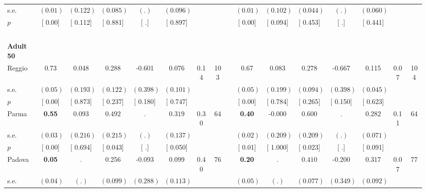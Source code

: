 \begin{longtable}{L{8em} c c c c c c c p{1em} c c c c c c c}
\quad \quad \quad \quad s.e.& $ (     0.01)$ & $ (    0.122)$ & $ (    0.085)$ & $ (        .)$ & $ (    0.096)$ & & & & $ (     0.01)$ & $ (    0.102)$ & $ (    0.044)$ & $ (        .)$ & $ (    0.060)$ & &  \\*
\quad \quad \quad \quad $ p$ & [     0.00] & [    0.112] & [    0.881] & [        .] & [    0.897] & & & & [     0.00] & [    0.094] & [    0.453] & [        .] & [    0.441] & &  \\[1em]
~\\[1em]
\quad \quad \textbf{Adult 50} & & & & & & & & & & & & & & & \\* 
\quad \quad \quad Reggio& 0.73 &     0.048 &     0.288 &    -0.601 &     0.076 &      0.14 &       103 & & 0.67 &     0.083 &     0.278 &    -0.667 &     0.115 &      0.07 &       104  \\*
\quad \quad \quad \quad s.e.& $ (     0.05)$ & $ (    0.193)$ & $ (    0.122)$ & $ (    0.398)$ & $ (    0.101)$ & & & & $ (     0.05)$ & $ (    0.199)$ & $ (    0.094)$ & $ (    0.398)$ & $ (    0.045)$ & &  \\*
\quad \quad \quad \quad $ p$ & [     0.00] & [    0.873] & [    0.237] & [    0.180] & [    0.747] & & & & [     0.00] & [    0.784] & [    0.265] & [    0.150] & [    0.623] & &  \\[1em]
\quad \quad \quad Parma& \textbf{     0.55} &     0.093 & $ \mathbf{    0.492}$ &         . & $ \mathbf{    0.319}$ &      0.30 &        64 & & \textbf{     0.40} &    -0.000 & $ \mathbf{    0.600}$ &         . & $ \mathbf{    0.282}$ &      0.11 &        64  \\*
\quad \quad \quad \quad s.e.& $ (     0.03)$ & $ (    0.216)$ & $ (    0.215)$ & $ (        .)$ & $ (    0.137)$ & & & & $ (     0.02)$ & $ (    0.209)$ & $ (    0.209)$ & $ (        .)$ & $ (    0.071)$ & &  \\*
\quad \quad \quad \quad $ p$ & [     0.00] & [    0.694] & [    0.043] & [        .] & [    0.050] & & & & [     0.01] & [    1.000] & [    0.023] & [        .] & [    0.091] & &  \\[1em]
\quad \quad \quad Padova& \textbf{     0.05} &         . &     0.256 &    -0.093 &     0.099 &      0.40 &        76 & & \textbf{     0.20} &         . & $ \mathbf{    0.410}$ &    -0.200 &     0.317 &      0.07 &        77  \\*
\quad \quad \quad \quad s.e.& $ (     0.04)$ & $ (        .)$ & $ (    0.099)$ & $ (    0.288)$ & $ (    0.113)$ & & & & $ (     0.05)$ & $ (        .)$ & $ (    0.077)$ & $ (    0.349)$ & $ (    0.092)$ & &  \\*

\end{longtable}
